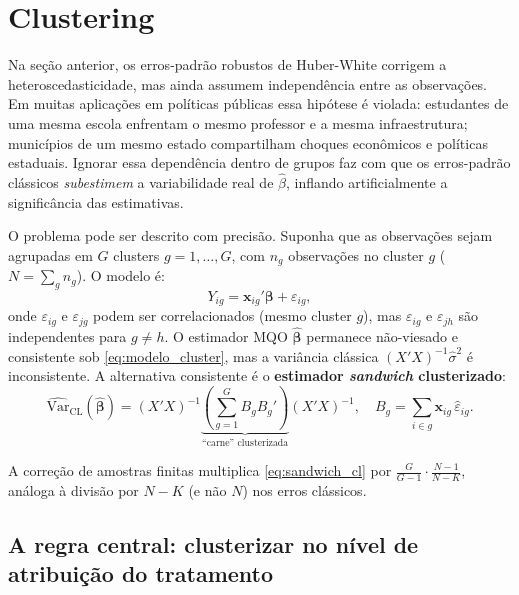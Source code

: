\section{Clustering}
\label{sec:clustering}

Na seção anterior, os erros-padrão robustos de Huber-White corrigem a heteroscedasticidade, mas ainda assumem independência entre as observações. Em muitas aplicações em políticas públicas essa hipótese é violada: estudantes de uma mesma escola enfrentam o mesmo professor e a mesma infraestrutura; municípios de um mesmo estado compartilham choques econômicos e políticas estaduais. Ignorar essa dependência dentro de grupos faz com que os erros-padrão clássicos \textit{subestimem} a variabilidade real de $\hat{\beta}$, inflando artificialmente a significância das estimativas.

O problema pode ser descrito com precisão. Suponha que as observações sejam agrupadas em $G$ clusters $g = 1, \ldots, G$, com $n_g$ observações no cluster $g$ ($N = \sum_g n_g$). O modelo é:
\begin{equation}
  Y_{ig} = \boldsymbol{x}_{ig}'\boldsymbol{\beta} + \varepsilon_{ig},
  \label{eq:modelo_cluster}
\end{equation}
onde $\varepsilon_{ig}$ e $\varepsilon_{jg}$ podem ser correlacionados (mesmo cluster $g$), mas $\varepsilon_{ig}$ e $\varepsilon_{jh}$ são independentes para $g \neq h$. O estimador MQO $\hat{\boldsymbol{\beta}}$ permanece não-viesado e consistente sob \eqref{eq:modelo_cluster}, mas a variância clássica $(X'X)^{-1}\hat{\sigma}^2$ é inconsistente. A alternativa consistente é o \textbf{estimador \textit{sandwich} clusterizado}:
\begin{equation}
  \widehat{\text{Var}}_{\text{CL}}(\hat{\boldsymbol{\beta}}) =
    (X'X)^{-1}
    \underbrace{\left(\sum_{g=1}^{G} B_g B_g'\right)}_{\text{``carne'' clusterizada}}
    (X'X)^{-1},
  \quad
  B_g = \sum_{i \in g} \boldsymbol{x}_{ig}\, \hat{\varepsilon}_{ig}.
  \label{eq:sandwich_cl}
\end{equation}

A correção de amostras finitas multiplica \eqref{eq:sandwich_cl} por $\frac{G}{G-1} \cdot \frac{N-1}{N-K}$, análoga à divisão por $N-K$ (e não $N$) nos erros clássicos.

\subsection*{A regra central: clusterizar no nível de atribuição do tratamento}

